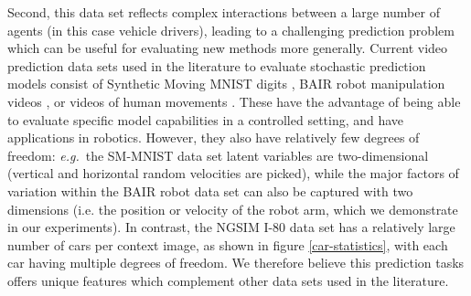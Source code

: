 \documentclass{article}
\begin{document}
Second, this data set reflects complex interactions between a large number of agents (in this case vehicle drivers), leading to a challenging prediction problem which can be useful for evaluating new methods more generally.
Current video prediction data sets used in the literature to evaluate stochastic prediction models consist of Synthetic Moving MNIST digits \citep{Denton2018}, BAIR robot manipulation videos \citep{Ebert17}, or videos of human movements \citep{Denton2018, Babaeizadeh2018}.
These have the advantage of being able to evaluate specific model capabilities in a controlled setting, and have applications in robotics.
However, they also have relatively few degrees of freedom: \emph{e.g.}\ the SM-MNIST data set latent variables are two-dimensional (vertical and horizontal random velocities are picked), while the major factors of variation within the BAIR robot data set can also be captured with two dimensions (i.e. the position or velocity of the robot arm, which we demonstrate in our experiments).
In contrast, the NGSIM I-80 data set has a relatively large number of cars per context image, as shown in figure \ref{car-statistics}, with each car having multiple degrees of freedom.
We therefore believe this prediction tasks offers unique features which complement other data sets used in the literature.
\end{document}
